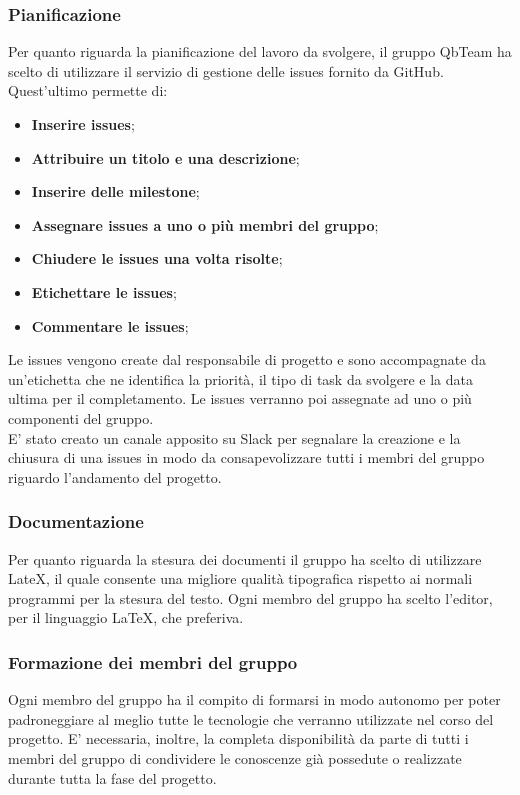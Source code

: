 \subsubsection{Pianificazione}
Per quanto riguarda la pianificazione del lavoro da svolgere, il gruppo QbTeam ha scelto di utilizzare 
il servizio di gestione delle issues fornito da GitHub. Quest'ultimo permette di:
\begin{itemize}
\item \textbf{Inserire issues};
\item \textbf{Attribuire un titolo e una descrizione};
\item \textbf{Inserire delle milestone};
\item \textbf{Assegnare issues a uno o più membri del gruppo};
\item \textbf{Chiudere le issues una volta risolte};
\item \textbf{Etichettare le issues};
\item \textbf{Commentare le issues};
\end{itemize}
Le issues vengono create dal responsabile di progetto e sono accompagnate da un'etichetta che ne identifica la priorità, il tipo di task da svolgere e la data ultima per il completamento. Le issues verranno poi assegnate ad uno o più componenti del gruppo.\\
E' stato creato un canale apposito su Slack per segnalare la creazione e la chiusura di una issues in modo da consapevolizzare tutti i membri del gruppo riguardo l'andamento del progetto.
\subsubsection{Documentazione}
Per quanto riguarda la stesura dei documenti il gruppo ha scelto di utilizzare LateX, il quale consente una migliore qualità tipografica rispetto ai normali programmi per la stesura del testo.
Ogni membro del gruppo ha scelto l'editor, per il linguaggio LaTeX, che preferiva.
\subsubsection{Formazione dei membri del gruppo}
Ogni membro del gruppo ha il compito di formarsi in modo autonomo per poter padroneggiare al meglio tutte le tecnologie che verranno utilizzate nel corso del progetto.
E' necessaria, inoltre, la completa disponibilità da parte di tutti i membri del gruppo di condividere le conoscenze già possedute o realizzate durante tutta la fase del progetto.

